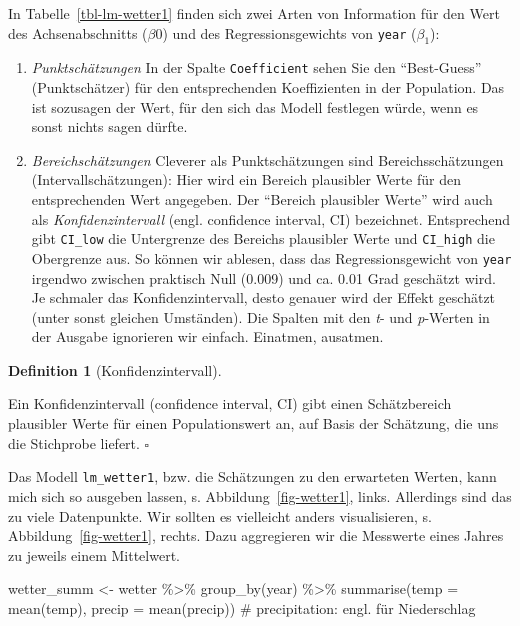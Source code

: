 \documentclass[
  letterpaper,
  twoside,
  open=any]{scrbook}
\newenvironment{Shaded}{\begin{snugshade}}{\end{snugshade}}
\newcommand{\AttributeTok}[1]{\textcolor[rgb]{0.40,0.45,0.13}{#1}}
\newcommand{\CommentTok}[1]{\textcolor[rgb]{0.37,0.37,0.37}{#1}}
\newcommand{\FunctionTok}[1]{\textcolor[rgb]{0.28,0.35,0.67}{#1}}
\newcommand{\NormalTok}[1]{\textcolor[rgb]{0.00,0.23,0.31}{#1}}
\newcommand{\OtherTok}[1]{\textcolor[rgb]{0.00,0.23,0.31}{#1}}
\newcommand{\SpecialCharTok}[1]{\textcolor[rgb]{0.37,0.37,0.37}{#1}}
\theoremstyle{definition}
\theoremstyle{definition}
\theoremstyle{definition}
\newtheorem{definition}{Definition}[chapter]
\theoremstyle{remark}
\begin{document}
In Tabelle~\ref{tbl-lm-wetter1} finden sich zwei Arten von Information
für den Wert des Achsenabschnitts (\(\beta 0\)) und des
Regressionsgewichts von \texttt{year} (\(\beta _1\)):

\begin{enumerate}
\def\labelenumi{\arabic{enumi}.}
\item
  \emph{Punktschätzungen} In der Spalte \texttt{Coefficient} sehen Sie
  den \enquote{Best-Guess} (Punktschätzer) für den entsprechenden
  Koeffizienten in der Population. Das ist sozusagen der Wert, für den
  sich das Modell festlegen würde, wenn es sonst nichts sagen dürfte.
\item
  \emph{Bereichschätzungen} Cleverer als Punktschätzungen sind
  Bereichsschätzungen (Intervallschätzungen): Hier wird ein Bereich
  plausibler Werte für den entsprechenden Wert angegeben. Der
  \enquote{Bereich plausibler Werte} wird auch als
  \emph{Konfidenzintervall} (engl. confidence interval, CI) bezeichnet.
  Entsprechend gibt \texttt{CI\_low} die Untergrenze des Bereichs
  plausibler Werte und \texttt{CI\_high} die Obergrenze aus. So können
  wir ablesen, dass das Regressionsgewicht von \texttt{year} irgendwo
  zwischen praktisch Null (0.009) und ca. 0.01 Grad geschätzt wird. Je
  schmaler das Konfidenzintervall, desto genauer wird der Effekt
  geschätzt (unter sonst gleichen Umständen). Die Spalten mit den
  \emph{t}- und \emph{p}-Werten in der Ausgabe ignorieren wir einfach.
  Einatmen, ausatmen.
\end{enumerate}

\begin{definition}[Konfidenzintervall]\protect\hypertarget{def-konfidenzintervall}{}\label{def-konfidenzintervall}

Ein Konfidenzintervall (confidence interval, CI) gibt einen
Schätzbereich plausibler Werte für einen Populationswert an, auf Basis
der Schätzung, die uns die Stichprobe liefert. \(\square\)

\end{definition}

Das Modell \texttt{lm\_wetter1}, bzw. die Schätzungen zu den erwarteten
Werten, kann mich sich so ausgeben lassen, s.
Abbildung~\ref{fig-wetter1}, links. Allerdings sind das zu viele
Datenpunkte. Wir sollten es vielleicht anders visualisieren, s.
Abbildung~\ref{fig-wetter1}, rechts. Dazu aggregieren wir die Messwerte
eines Jahres zu jeweils einem Mittelwert.

\begin{Shaded}
\begin{Highlighting}[]
\NormalTok{wetter\_summ }\OtherTok{\textless{}{-}}
\NormalTok{  wetter }\SpecialCharTok{\%\textgreater{}\%} 
  \FunctionTok{group\_by}\NormalTok{(year) }\SpecialCharTok{\%\textgreater{}\%} 
  \FunctionTok{summarise}\NormalTok{(}\AttributeTok{temp =} \FunctionTok{mean}\NormalTok{(temp),}
            \AttributeTok{precip =} \FunctionTok{mean}\NormalTok{(precip))  }\CommentTok{\# precipitation: engl. für Niederschlag}
\end{Highlighting}
\end{Shaded}
\end{document}
